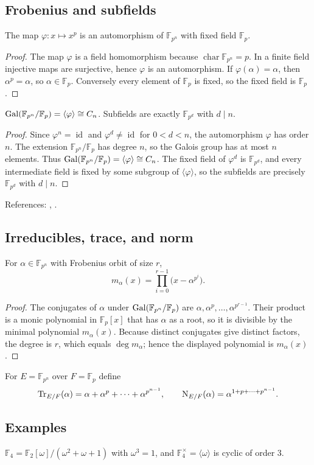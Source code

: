 \subsection{Frobenius and subfields}
\begin{proposition}[Frobenius]
The map $\varphi:x\mapsto x^p$ is an automorphism of $\mathbb{F}_{p^n}$ with fixed field $\mathbb{F}_p$.
\end{proposition}
\begin{proof}
The map $\varphi$ is a field homomorphism because $\operatorname{char}\mathbb{F}_{p^n}=p$.
In a finite field injective maps are surjective, hence $\varphi$ is an
automorphism.
If $\varphi(\alpha)=\alpha$, then $\alpha^p=\alpha$, so $\alpha\in\mathbb{F}_p$.
Conversely every element of $\mathbb{F}_p$ is fixed, so the fixed field is
$\mathbb{F}_p$.
\end{proof}
\begin{theorem}
$\operatorname{Gal}(\mathbb{F}_{p^n}/\mathbb{F}_p)=\langle \varphi\rangle\cong C_n$. Subfields are exactly $\mathbb{F}_{p^d}$ with $d\mid n$.
\end{theorem}
\begin{proof}
Since $\varphi^n=\operatorname{id}$ and $\varphi^d\ne\operatorname{id}$ for $0<d<n$, the
automorphism $\varphi$ has order $n$.
The extension $\mathbb{F}_{p^n}/\mathbb{F}_p$ has degree $n$, so the
Galois group has at most $n$ elements.
Thus $\operatorname{Gal}(\mathbb{F}_{p^n}/\mathbb{F}_p)=\langle\varphi\rangle\cong C_n$.
The fixed field of $\varphi^d$ is $\mathbb{F}_{p^d}$, and every
intermediate field is fixed by some subgroup of $\langle\varphi\rangle$,
so the subfields are precisely $\mathbb{F}_{p^d}$ with $d\mid n$.
\end{proof}
References: \cite[\S13]{DF}, \cite[Ch.~VIII]{Lang}.

\subsection{Irreducibles, trace, and norm}
\begin{proposition}
For $\alpha\in\mathbb{F}_{p^n}$ with Frobenius orbit of size $r$,
\[
m_\alpha(x)=\prod_{i=0}^{r-1}\bigl(x-\alpha^{p^i}\bigr).
\]
\end{proposition}
\begin{proof}
The conjugates of $\alpha$ under $\operatorname{Gal}(\mathbb{F}_{p^n}/\mathbb{F}_p)$ are
$\alpha,\alpha^p,\ldots,\alpha^{p^{r-1}}$.
Their product is a monic polynomial in $\mathbb{F}_p[x]$ that has $\alpha$
as a root, so it is divisible by the minimal polynomial $m_\alpha(x)$.
Because distinct conjugates give distinct factors, the degree is $r$,
which equals $\deg m_\alpha$; hence the displayed polynomial is
$m_\alpha(x)$.
\end{proof}
\begin{definition}
For $E=\mathbb{F}_{p^n}$ over $F=\mathbb{F}_p$ define
\[
\operatorname{Tr}_{E/F}(\alpha)=\alpha+\alpha^p+\cdots+\alpha^{p^{n-1}},\qquad
\operatorname{N}_{E/F}(\alpha)=\alpha^{1+p+\cdots+p^{n-1}}.
\]
\end{definition}

\subsection{Examples}
\begin{example}
$\mathbb{F}_4=\mathbb{F}_2[\omega]/(\omega^2+\omega+1)$ with $\omega^3=1$, and $\mathbb{F}_4^\times=\langle\omega\rangle$ is cyclic of order $3$.
\end{example}
